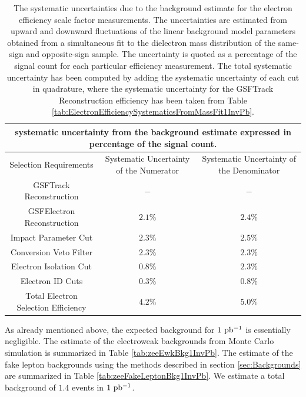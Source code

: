 \documentclass{cmspaper}
\begin{document}
\begin{table}[!ht]
\begin{center}
\begin{tabular}{|c|c|c|}
\hline
 \multicolumn{3}{|c|}{systematic uncertainty from the background estimate expressed in percentage of the signal count.} \\
\hline
 Selection Requirements & Systematic Uncertainty of the Numerator & Systematic Uncertainty of the Denominator  \\
\hline
\hline
 GSFTrack Reconstruction              & $ - $     & $ - $     \\
 GSFElectron Reconstruction           & $ 2.1\%$  & $ 2.4\%$  \\
 Impact Parameter Cut                 & $ 2.3\%$  & $ 2.5\%$  \\
 Conversion Veto Filter               & $ 2.3\%$  & $ 2.3\%$  \\
 Electron Isolation Cut               & $ 0.8\%$  & $ 2.3\%$  \\
 Electron ID Cuts                     & $ 0.3\%$  & $ 0.8\%$  \\
\hline                               
 Total Electron Selection Efficiency & $4.2\%$  & $5.0\% $  \\
\hline                               
\end{tabular}
\caption{The systematic uncertainties due to the background estimate for the electron efficiency scale factor measurements. The uncertainties are estimated from upward and downward fluctuations of the linear background model parameters obtained from a simultaneous fit to the dielectron mass distribution of the same-sign and opposite-sign sample. The uncertainty is quoted as a percentage of the signal count for each particular efficiency measurement. The total systematic uncertainty has been computed by adding the systematic uncertainty of each cut in quadrature, where the systematic uncertainty for the GSFTrack Reconstruction efficiency has been taken from Table \ref{tab:ElectronEfficiencySystematicsFromMassFit1InvPb}. \label{tab:ElectronEfficiencySystematicsFromSSOSSimultaneousFit1InvPb}}
\end{center}
\end{table}


As already mentioned above, the expected background for $1\ \mathrm{pb^{-1}}$ is essentially negligible. The estimate of the electroweak backgrounds from Monte Carlo simulation is summarized in Table \ref{tab:zeeEwkBkg1InvPb}. The estimate of the fake lepton backgrounds using the methods described in section \ref{sec:Backgrounds} are summarized in Table \ref{tab:zeeFakeLeptonBkg1InvPb}. We estimate a total background of $1.4$ events in $1\ \mathrm{pb^{-1}}$.
\end{document}
